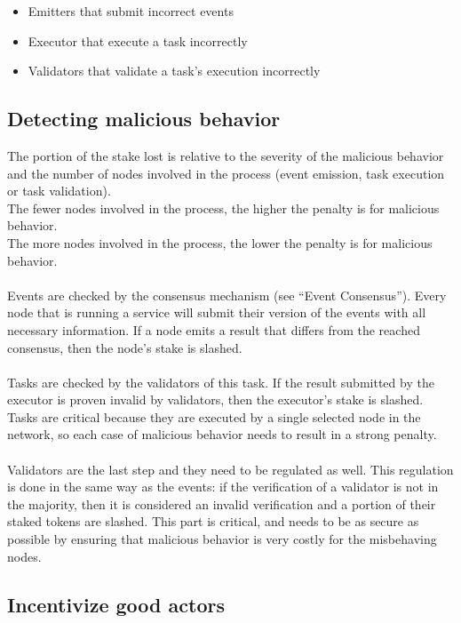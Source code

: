\documentclass[12pt,a4paper,final]{article}
\begin{document}
\begin{itemize}
\item Emitters that submit incorrect events
\item Executor that execute a task incorrectly
\item Validators that validate a task’s execution incorrectly
\end{itemize}

\subsection{Detecting malicious behavior}

The portion of the stake lost is relative to the severity of the malicious behavior and the number of nodes involved in the process (event emission, task execution or task validation).
\\
The fewer nodes involved in the process, the higher the penalty is for malicious behavior.
\\
The more nodes involved in the process, the lower the penalty is for malicious behavior.
\\\\
Events are checked by the consensus mechanism (see “Event Consensus”). Every node that is running a service will submit their version of the events with all necessary information. If a node emits a result that differs from the reached consensus, then the node’s stake is slashed.
\\\\
Tasks are checked by the validators of this task. If the result submitted by the executor is proven invalid by validators, then the executor’s stake is slashed. Tasks are critical because they are executed by a single selected node in the network, so each case of malicious behavior needs to result in a strong penalty.
\\\\
Validators are the last step and they need to be regulated as well. This regulation is done in the same way as the events: if the verification of a validator is not in the majority, then it is considered an invalid verification and a portion of their staked tokens are slashed. This part is critical, and needs to be as secure as possible by ensuring that malicious behavior is very costly for the misbehaving nodes.

\subsection{Incentivize good actors}
\end{document}
